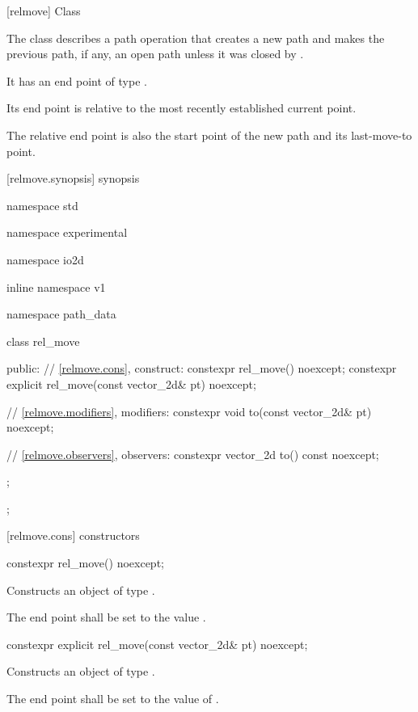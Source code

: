 [relmove] {Class }

\pnum
{}
The class  describes a path operation that creates a new path and makes the previous path, if any, an open path unless it was closed by .

\pnum
It has an end point of type .

\pnum
Its end point is relative to the most recently established current point.

\pnum
The relative end point is also the start point of the new path and its last-move-to point.

 [relmove.synopsis] { synopsis}

\begin{codeblock}
namespace std { namespace experimental { namespace io2d { inline namespace v1 {
  namespace path_data {
    class rel_move {
    public:
      // \ref{relmove.cons}, construct:
      constexpr rel_move() noexcept;
      constexpr explicit rel_move(const vector_2d& pt) noexcept;

      // \ref{relmove.modifiers}, modifiers:
      constexpr void to(const vector_2d& pt) noexcept;

      // \ref{relmove.observers}, observers:
      constexpr vector_2d to() const noexcept;
    };
  };
} } } }
\end{codeblock}

 [relmove.cons] { constructors}

\begin{itemdecl}
constexpr rel_move() noexcept;
\end{itemdecl}
\begin{itemdescr}
\pnum
\effects
Constructs an object of type .

\pnum
The end point shall be set to the value .
\end{itemdescr}

\begin{itemdecl}
constexpr explicit rel_move(const vector_2d& pt) noexcept;
\end{itemdecl}
\begin{itemdescr}
\pnum
\effects
Constructs an object of type .

\pnum
The end point shall be set to the value of .
\end{itemdescr}


